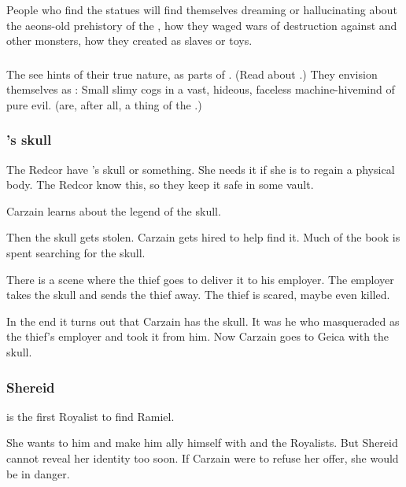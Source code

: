 People who find the statues will find themselves dreaming or hallucinating about the aeons-old prehistory of the \banes, how they waged wars of destruction against \dragons and other monsters, how they created \humanity as slaves or toys.





\subsubsection{\Lithrim}
The \humans see hints of their true nature, as parts of . 
(Read about \Lithrim.) 
They envision themselves as \banes:
Small slimy cogs in a vast, hideous, faceless machine-hivemind of pure evil. 
(\Banes are, after all, a thing of the .)





\subsubsection{\Belzir's skull}
The Redcor have \Belzir's skull or something.
She needs it if she is to regain a physical body. 
The Redcor know this, so they keep it safe in some vault. 

Carzain learns about the legend of the skull.

Then the skull gets stolen.
Carzain gets hired to help find it. 
Much of the book is spent searching for the skull. 

There is a scene where the thief goes to deliver it to his employer.
The employer takes the skull and sends the thief away.
The thief is scared, maybe even killed. 

In the end it turns out that Carzain has the skull.
It was he who masqueraded as the thief's employer and took it from him.
Now Carzain goes to Geica with the skull.





\subsubsection{Shereid}
 is the first Royalist to find Ramiel. 

She wants to  him and make him ally himself with \Belzir{} and the Royalists.
But Shereid cannot reveal her identity too soon. 
If Carzain were to refuse her offer, she would be in danger. 

